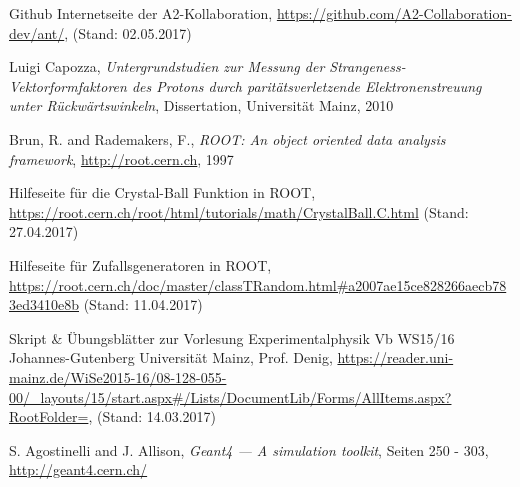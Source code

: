 \documentclass[a4paper,11pt,oneside,final,german,openbib,pdftex]{scrbook}
\begin{document}
{\begin{appendix}



\renewcommand{\bibname}{\bfont Literaturverzeichnis} 

\begin{thebibliography}{99}
 Github Internetseite der A2-Kollaboration, \url{https://github.com/A2-Collaboration-dev/ant/}, (Stand: 02.05.2017)

 Luigi Capozza, {\em Untergrundstudien zur Messung der
	Strangeness-Vektorformfaktoren
	des Protons durch parit\"atsverletzende
	Elektronenstreuung unter R\"uckw\"artswinkeln}, Dissertation, Universität Mainz, 2010 


 Brun, R. and Rademakers, F., \textit{ROOT: An object oriented data analysis framework}, \url{http://root.cern.ch}, 1997 

 Hilfeseite für die Crystal-Ball Funktion in ROOT, \url{https://root.cern.ch/root/html/tutorials/math/CrystalBall.C.html} (Stand: 27.04.2017)

 Hilfeseite f\"ur Zufallsgeneratoren in ROOT, \url{https://root.cern.ch/doc/master/classTRandom.html#a2007ae15ce828266aecb783ed3410e8b} (Stand: 11.04.2017)


 Skript \& Übungsblätter zur Vorlesung Experimentalphysik Vb WS15/16 Johannes-Gutenberg Universit\"at Mainz, Prof. Denig, \url{https://reader.uni-mainz.de/WiSe2015-16/08-128-055-00/_layouts/15/start.aspx#/Lists/DocumentLib/Forms/AllItems.aspx?RootFolder=}, (Stand: 14.03.2017)

 S. Agostinelli and J. Allison, \textit{Geant4 — A simulation toolkit}, Seiten 250 - 303, \url{http://geant4.cern.ch/}



\end{thebibliography}
\end{appendix}}
\end{document}
